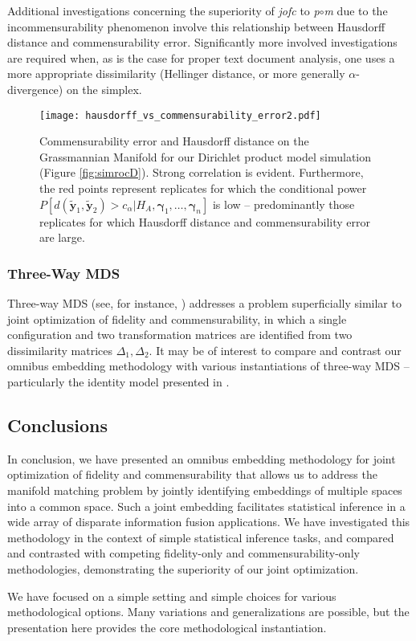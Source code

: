 \documentclass[12pt,xcolor]{article}
\newcommand{\1}{\ensuremath{\mbox{{\bf 1}}}}
\begin{document}
Additional investigations concerning the superiority of {\em jofc} to {\it p}$\circ${\it m}
due to the incommensurability phenomenon involve this relationship between Hausdorff distance and commensurability error.
Significantly more involved investigations are required when,
as is the case for proper text document analysis, one uses a more appropriate dissimilarity
(Hellinger distance, or more generally $\alpha$-divergence) on the simplex.

  \begin{figure}[h]
  \begin{center}
    \texttt{[image: hausdorff\_vs\_commensurability\_error2.pdf]}
    \caption{Commensurability error and Hausdorff distance on the Grassmannian Manifold
    for our Dirichlet product model simulation (Figure \ref{fig:simrocD}).
    Strong correlation is evident.
    Furthermore, the red points represent replicates for which the conditional power
	$P[d(\widetilde{\bm{y}}_1,\widetilde{\bm{y}}_2)>c_{\alpha} | H_A,\bm{\gamma}_1,\ldots,\bm{\gamma}_n]$
    is low --
    predominantly those replicates for which Hausdorff distance and commensurability error are large.}\label{fig:grass}
  \end{center}
  \end{figure}

\subsubsection*{Three-Way MDS}

Three-way MDS (see, for instance, \cite{BG05})
addresses a problem superficially similar to joint optimization of fidelity and commensurability,
in which a single configuration and two transformation matrices
are identified from two dissimilarity matrices $\Delta_1,\Delta_2$.
It may be of interest to compare and contrast our omnibus embedding methodology
with various instantiations of three-way MDS -- particularly the identity model
presented in \cite{CH93}.

\subsection{Conclusions}

In conclusion,
we have presented an omnibus embedding methodology
for joint optimization of fidelity and commensurability
that allows us to address the manifold matching problem
by jointly identifying embeddings of multiple spaces into a common space.
Such a joint embedding facilitates statistical inference
in a wide array of disparate information fusion applications.
We have investigated this methodology in the context of simple statistical inference tasks,
and compared and contrasted with competing fidelity-only and commensurability-only
methodologies, demonstrating the superiority of our joint optimization.

We have focused on a simple setting and simple choices for various methodological options.
Many variations and generalizations are possible,
but the presentation here provides the core methodological instantiation.



\end{document}
